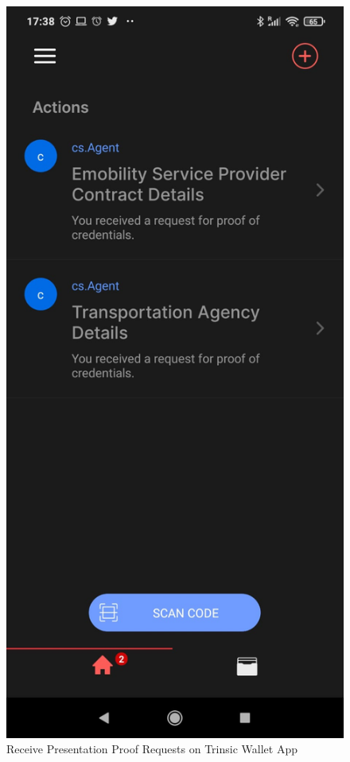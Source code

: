 \begin{figure}[H]
\centering
\begin{minipage}{.33\textwidth}
  \centering
  \includegraphics[width=.8\linewidth]{images/Frontend/Charging/3.0.jpeg}
  \caption[]{Receive Presentation Proof Requests on Trinsic Wallet App}
  \label{fig:charging_screenshot_3}
\end{minipage}%
\begin{minipage}{.33\textwidth}
  \centering

\end{minipage}
\end{figure}
